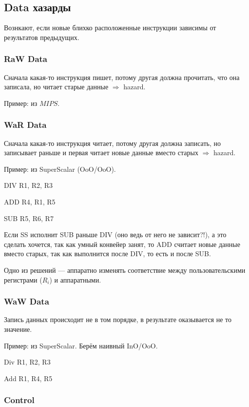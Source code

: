 \documentclass[12pt, a4paper]{article}
\begin{document}
\subsection{Data хазарды}

Вознкают, если новые блихко расположенные инструкции зависимы от результатов предыдущих.

\subsubsection{RaW Data}

Сначала какая-то инструкция пишет, потому другая должна прочитать, что она записала, но читает старые данные $\Rightarrow$ hazard.

Пример: из $MIPS$.



\subsubsection{WaR Data}

Сначала какая-то инструкция читает, потому другая должна записать, но записывает раньше и первая читает новые данные вместо старых $\Rightarrow$ hazard.

Пример: из SuperScalar (OoO/OoO).

DIV R1, R2, R3

ADD R4, R1, R5

SUB R5, R6, R7

Если SS исполнит SUB раньше DIV (оно ведь от него не зависит?!), а это сделать хочется, так как умный конвейер занят,
то ADD считает новые данные вместо старых, так как выполнится после DIV, то есть и после SUB.

Одно из решений — аппаратно изменять соответствие между пользовательскими регистрами ($R_i$) 
и аппаратными.


\subsubsection{WaW Data}

Запись данных происходит не в том порядке, в результате оказывается не то значение.

Пример: из SuperScalar.
Берём наивный InO/OoO.

Div R1, R2, R3

Add R1, R4, R5



\subsubsection{Control}
\end{document}
